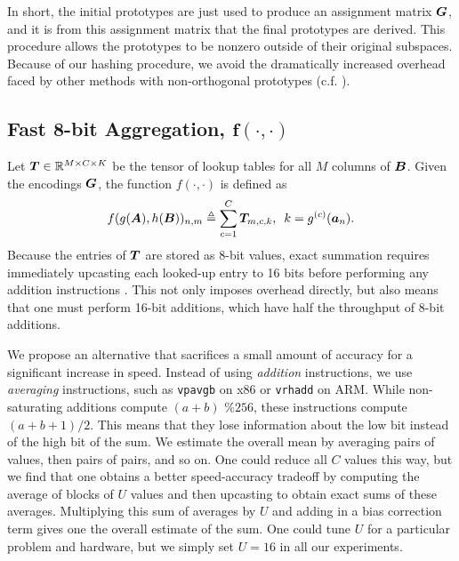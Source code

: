 In short, the initial prototypes are just used to produce an assignment matrix $\bm{G}$, and it is from this assignment matrix that the final prototypes are derived. This procedure allows the prototypes to be nonzero outside of their original subspaces. Because of our hashing procedure, we avoid the dramatically increased overhead faced by other methods with non-orthogonal prototypes (c.f. \cite{otq,aq,cq,grvq,lsq,stackedQuantizers}).

\vspace{-1.5mm}
\subsection{Fast 8-bit Aggregation, $\bm{f(\cdot,\cdot)}$} \label{sec:aggregate}
\vspace{-.5mm}
Let $\bm{T} \in \mathbb{R}^{M \times C \times K}$ be the tensor of lookup tables for all $M$ columns of $\bm{B}$.
Given the encodings $\bm{G}$, the function $f(\cdot,\cdot)$ is defined as
\begin{align}
    f(g(\bm{A}), h(\bm{B}))_{n,m} \triangleq \sum_{c=1}^C \bm{T}_{m,c,k} \text{, }\text{ } k = g^{(c)}(\bm{a}_n).
\end{align}
Because the entries of $\bm{T}$ are stored as 8-bit values, exact summation requires immediately upcasting each looked-up entry to 16 bits before performing any addition instructions \cite{bolt}. This not only imposes overhead directly, but also means that one must perform 16-bit additions, which have half the throughput of 8-bit additions.

We propose an alternative that sacrifices a small amount of accuracy for a significant increase in speed. Instead of using \textit{addition} instructions, we use \textit{averaging} instructions, such as \texttt{vpavgb} on x86 or \texttt{vrhadd} on ARM. While non-saturating additions compute $(a + b) \textrm{ \% } 256$, these instructions compute $(a + b + 1) / 2$. This means that they lose information about the low bit instead of the high bit of the sum. We estimate the overall mean by averaging pairs of values, then pairs of pairs, and so on. One could reduce all $C$ values this way, but we find that one obtains a better speed-accuracy tradeoff by computing the average of blocks of $U$ values and then upcasting to obtain exact sums of these averages. Multiplying this sum of averages by $U$ and adding in a bias correction term gives one the overall estimate of the sum. One could tune $U$ for a particular problem and hardware, but we simply set $U = 16$ in all our experiments.

